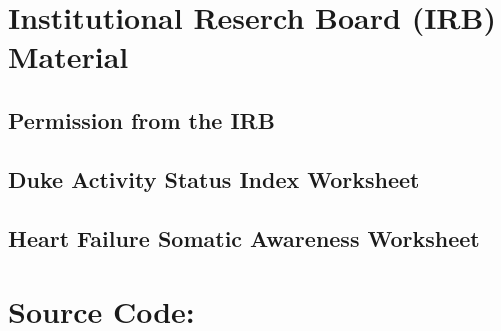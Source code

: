 \documentclass{umthesis}
\renewcommand{\cftchappresnum}{\chaptername\space} %
\begin{document}
\begin{appendices}


\chapter {Institutional Reserch Board (IRB) Material}
\section{Permission from the IRB}

\section{Duke Activity Status Index Worksheet}

\section{Heart Failure Somatic Awareness Worksheet}


\chapter*{Source Code:}
\cftsetpnumwidth{2in}




\end{appendices}
\end{document}
